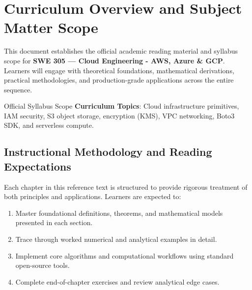 \section{Curriculum Overview and Subject Matter Scope}

This document establishes the official academic reading material and syllabus scope for \textbf{SWE 305 --- Cloud Engineering - AWS, Azure \& GCP}. Learners will engage with theoretical foundations, mathematical derivations, practical methodologies, and production-grade applications across the entire sequence.

\begin{InsightBox}{Official Syllabus Scope}
  \textbf{Curriculum Topics}: Cloud infrastructure primitives, IAM security, S3 object storage, encryption (KMS), VPC networking, Boto3 SDK, and serverless compute.
\end{InsightBox}

\subsection{Instructional Methodology and Reading Expectations}

Each chapter in this reference text is structured to provide rigorous treatment of both principles and applications. Learners are expected to:
\begin{enumerate}
  \item Master foundational definitions, theorems, and mathematical models presented in each section.
  \item Trace through worked numerical and analytical examples in detail.
  \item Implement core algorithms and computational workflows using standard open-source tools.
  \item Complete end-of-chapter exercises and review analytical edge cases.
\end{enumerate}

